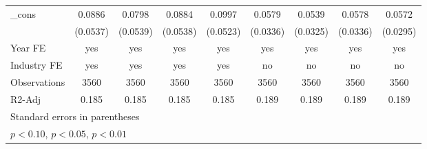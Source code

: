 \begin{table}[htbp]
\begin{tabular}{l*{8}{c}}
\_cons              &      0.0886         &      0.0798         &      0.0884         &      0.0997\sym{*}  &      0.0579\sym{*}  &      0.0539         &      0.0578\sym{*}  &      0.0572\sym{*}  \\
                    &    (0.0537)         &    (0.0539)         &    (0.0538)         &    (0.0523)         &    (0.0336)         &    (0.0325)         &    (0.0336)         &    (0.0295)         \\
\hline
Year FE             &         yes         &         yes         &         yes         &         yes         &         yes         &         yes         &         yes         &         yes         \\
Industry FE         &         yes         &         yes         &         yes         &         yes         &          no         &          no         &          no         &          no         \\
Observations        &        3560         &        3560         &        3560         &        3560         &        3560         &        3560         &        3560         &        3560         \\
R2-Adj              &       0.185         &       0.185         &       0.185         &       0.185         &       0.189         &       0.189         &       0.189         &       0.189         \\
\hline\hline
\multicolumn{9}{l}{\footnotesize Standard errors in parentheses}\\
\multicolumn{9}{l}{\footnotesize \sym{*} \(p<0.10\), \sym{**} \(p<0.05\), \sym{***} \(p<0.01\)}\\
\end{tabular}
\end{table}
